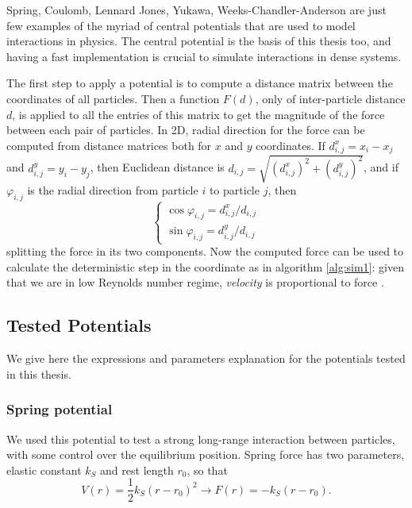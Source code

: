 \documentclass[../../master_thesis_np.tex]{subfiles}
\begin{document}
	Spring, Coulomb, Lennard Jones, Yukawa, Weeks-Chandler-Anderson are just few examples of the myriad of central potentials that are used to model interactions in physics. 
	The central potential is the basis of this thesis too, and having a fast implementation is crucial to simulate interactions in dense systems. 
	
	The first step to apply a potential is to compute a distance matrix between the coordinates of all particles. 
	Then a function $F(d)$, only of inter-particle distance $d$, is applied to all the entries of this matrix to get the magnitude of the force between each pair of particles. 
	In 2D, radial direction for the force can be computed from distance matrices both for $x$ and $y$ coordinates. 
	If $d^x_{i,j} = x_i - x_j$ and $d^y_{i,j} = y_i - y_j$, then Euclidean distance is $d_{i,j} = \sqrt{(d^x_{i,j})^2 + (d^y_{i,j})^2}$, and if $\varphi_{i,j}$ is the radial direction from particle $i$ to particle $j$, then
	\begin{equation}
		\begin{cases}
			\cos\varphi_{i,j} = d^x_{i,j}/d_{i,j}\\
			\sin\varphi_{i,j} = d^y_{i,j}/d_{i,j}
		\end{cases}
	\end{equation}
	splitting the force in its two components.
	Now the computed force can be used to calculate the deterministic step in the coordinate as in algorithm \ref{alg:sim1}: given that we are in low Reynolds number regime, \emph{velocity} is proportional to force . 
	
	\subsection{Tested Potentials}
			
	We give here the expressions and parameters explanation for the potentials tested in this thesis.
	
	\subsubsection{Spring potential}
	We used this potential to test a strong long-range interaction between particles, with some control over the equilibrium position.
	Spring force has two parameters, elastic constant $k_S$ and rest length $r_0$, so that 
	\begin{equation}
		V(r) = \frac{1}{2}k_S (r-r_0)^2 \rightarrow F(r) = -k_S(r-r_0).
	\end{equation}
\end{document}
